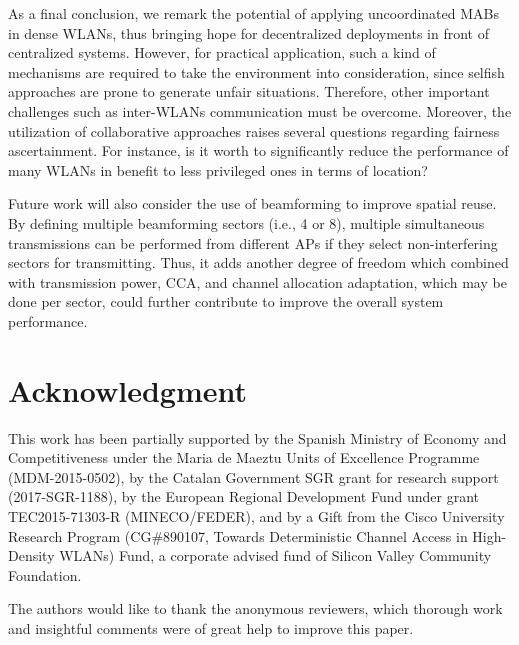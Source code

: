 \documentclass{article}
\begin{document}
As a final conclusion, we remark the potential of applying uncoordinated MABs in dense WLANs, thus bringing hope for decentralized deployments in front of centralized systems. However, for practical application, such a kind of mechanisms are required to take the environment into consideration, since selfish approaches are prone to generate unfair situations. Therefore, other important challenges such as inter-WLANs communication must be overcome. Moreover, the utilization of collaborative approaches raises several questions regarding fairness ascertainment. For instance, is it worth to significantly reduce the performance of many WLANs in benefit to less privileged ones in terms of location?

Future work will also consider the use of beamforming to improve spatial reuse. By defining multiple beamforming sectors (i.e., 4 or 8), multiple simultaneous transmissions can be performed from different APs if they select non-interfering sectors for transmitting. Thus, it adds another degree of freedom which combined with transmission power, CCA, and channel allocation adaptation, which may be done per sector, could further contribute to improve the overall system performance.

\section*{Acknowledgment}
This work has been partially supported by the Spanish Ministry of Economy and Competitiveness under the Maria de Maeztu Units of Excellence Programme (MDM-2015-0502), by the Catalan Government SGR grant for research support (2017-SGR-1188), by the European Regional Development Fund under grant TEC2015-71303-R (MINECO/FEDER), and by a Gift from the Cisco University Research Program (CG\#890107, Towards Deterministic Channel Access in High-Density WLANs) Fund, a corporate advised fund of Silicon Valley Community Foundation.

The authors would like to thank the anonymous reviewers, which thorough work and insightful comments were of great help to improve this paper.
\end{document}
